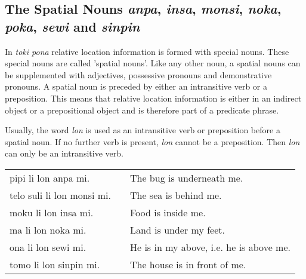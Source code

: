 %
%
\newpage
{}
\subsection*{The Spatial Nouns \textit{anpa}, \textit{insa}, \textit{monsi}, \textit{noka}, \textit{poka}, \textit{sewi} and \textit{sinpin}}
%

In \textit{toki pona} relative location information is formed with special nouns. 
These special nouns are called 'spatial nouns'. 
Like any other noun, a spatial nouns can be supplemented with adjectives, possessive pronouns and demonstrative pronouns. 
A spatial noun is preceded by either an intransitive verb or a preposition. 
This means that relative location information is either in an indirect object or a prepositional object and is therefore part of a predicate phrase.

Usually, the word \textit{lon} is used as an intransitive verb or preposition before a spatial noun. 
If no further verb is present, \textit{lon} cannot be a preposition. 
Then \textit{lon} can only be an intransitive verb.

\begin{supertabular}{p{5,5cm}|ll}
pipi li lon anpa mi.       && The bug is underneath me. \\
telo suli li lon monsi mi. && The sea is behind me.  \\
moku li lon insa mi.       && Food is inside me. \\
ma li lon noka mi.         && Land is under my feet. \\
ona li lon sewi mi.        && He is in my above, i.e. he is above me. \\
tomo li lon sinpin mi.     && The house is in front of me. \\
\end{supertabular} 

